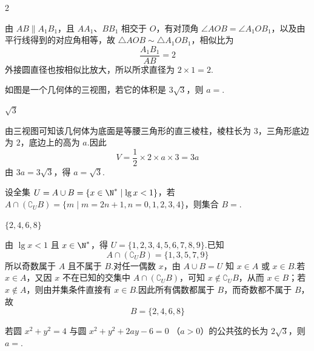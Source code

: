 \begin{answer}
2
\end{answer}

\begin{solution}
由 \(AB\parallel A_1B_1\)，且 \(AA_1\)、\(BB_1\) 相交于 \(O\)，有对顶角 \(\angle AOB=\angle A_1OB_1\)，以及由平行线得到的对应角相等，故 \(\triangle AOB\sim\triangle A_1OB_1\)，相似比为
\[
\frac{A_1B_1}{AB}=2
\]
外接圆直径也按相似比放大，所以所求直径为 \(2\times1=2\).
\end{solution}

\begin{problem}
如图是一个几何体的三视图，若它的体积是 \(3 \sqrt{3}\)，则 \(a =\)\fillinblank{}.

\end{problem}

\begin{answer}
\(\sqrt{3}\)
\end{answer}

\begin{solution}
由三视图可知该几何体为底面是等腰三角形的直三棱柱，棱柱长为 \(3\)，三角形底边为 \(2\)，底边上的高为 \(a\).因此
\[
V=\frac12\times2\times a\times3=3a
\]
由 \(3a=3\sqrt3\)，得 \(a=\sqrt3\).
\end{solution}

\begin{problem}
设全集 \(U = A \cup B = \{x \in \N^{*} \mid \lg x < 1\}\)，若 \(A \cap (\complement_U B) = \{m \mid m = 2n + 1, n = 0, 1, 2, 3, 4\}\)，则集合 \(B = \)\fillinblank{}.
\end{problem}

\begin{answer}
\(\{2,4,6,8\}\)
\end{answer}

\begin{solution}
由 \(\lg x<1\) 且 \(x\in\N^*\)，得 \(U=\{1,2,3,4,5,6,7,8,9\}\).已知
\[
A\cap(\complement_U B)=\{1,3,5,7,9\}
\]
所以奇数属于 \(A\) 且不属于 \(B\).对任一偶数 \(x\)，由 \(A\cup B=U\) 知 \(x\in A\) 或 \(x\in B\).若 \(x\in A\)，又因 \(x\) 不在已知的交集中 \(A\cap(\complement_U B)\)，可知 \(x\notin\complement_U B\)，从而 \(x\in B\)；若 \(x\notin A\)，则由并集条件直接有 \(x\in B\).因此所有偶数都属于 \(B\)，而奇数都不属于 \(B\)，故
\[
B=\{2,4,6,8\}
\]
\end{solution}

\begin{problem}
若圆 \(x^{2} + y^{2} = 4\) 与圆 \(x^{2} + y^{2} + 2ay - 6 = 0 \) （\(a > 0\)）的公共弦的长为 \(2\sqrt{3}\)，则 \(a = \)\fillinblank{}.
\end{problem}

